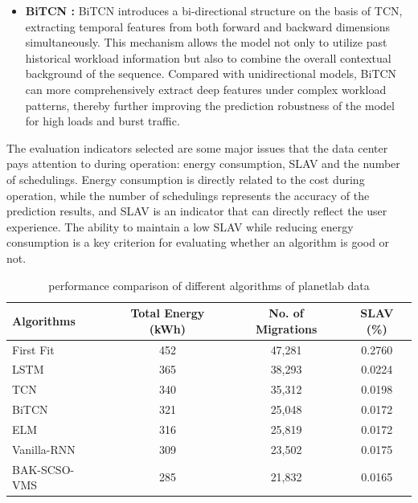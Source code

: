 \documentclass[conference]{{IEEEtran}}
\begin{document}
\begin{itemize}
\item \textbf{BiTCN \cite{wei2020bitcoin}:} BiTCN introduces a bi-directional structure on the basis of TCN, extracting temporal features from both forward and backward dimensions simultaneously. This mechanism allows the model not only to utilize past historical workload information but also to combine the overall contextual background of the sequence. Compared with unidirectional models, BiTCN can more comprehensively extract deep features under complex workload patterns, thereby further improving the prediction robustness of the model for high loads and burst traffic.

\end{itemize}
The evaluation indicators selected are some major issues that the data center pays attention to during operation: energy consumption, SLAV and the number of schedulings. Energy consumption is directly related to the cost during operation, while the number of schedulings represents the accuracy of the prediction results, and SLAV is an indicator that can directly reflect the user experience. The ability to maintain a low SLAV while reducing energy consumption is a key criterion for evaluating whether an algorithm is good or not.
\begin{table}[htbp]
\centering
\caption{performance comparison of different algorithms of planetlab data}
\label{tab:performance_comparison}
\begin{tabular}{l c c c} 
\toprule %
\textbf{Algorithms} & \textbf{Total Energy (kWh)} & \textbf{No. of Migrations} & \textbf{SLAV (\%)} \\
\midrule %
First Fit      & 452& 47,281& 0.2760\\
LSTM           & 365& 38,293& 0.0224\\
TCN            & 340& 35,312& 0.0198\\
BiTCN          & 321& 25,048& 0.0172\\
ELM            & 316& 25,819& 0.0172\\
Vanilla-RNN    & 309& 23,502& 0.0175\\
BAK-SCSO-VMS& 285& 21,832& 0.0165\\
\bottomrule %
\end{tabular}
\end{table}
\end{document}
